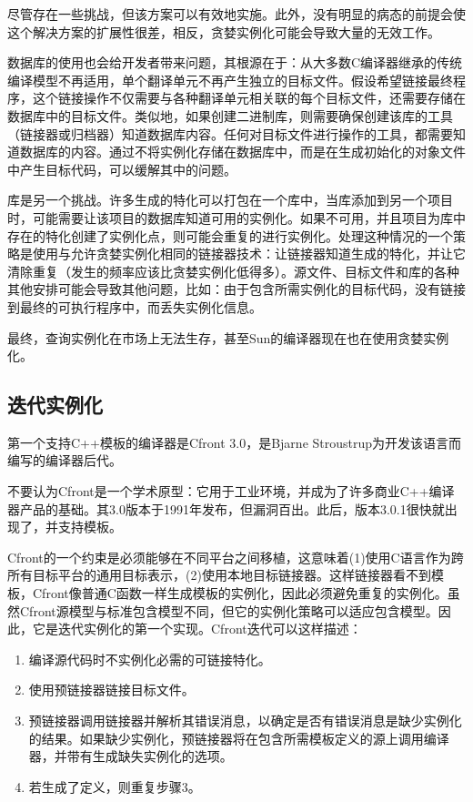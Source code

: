 尽管存在一些挑战，但该方案可以有效地实施。此外，没有明显的病态的前提会使这个解决方案的扩展性很差，相反，贪婪实例化可能会导致大量的无效工作。

数据库的使用也会给开发者带来问题，其根源在于：从大多数C编译器继承的传统编译模型不再适用，单个翻译单元不再产生独立的目标文件。假设希望链接最终程序，这个链接操作不仅需要与各种翻译单元相关联的每个目标文件，还需要存储在数据库中的目标文件。类似地，如果创建二进制库，则需要确保创建该库的工具（链接器或归档器）知道数据库内容。任何对目标文件进行操作的工具，都需要知道数据库的内容。通过不将实例化存储在数据库中，而是在生成初始化的对象文件中产生目标代码，可以缓解其中的问题。

库是另一个挑战。许多生成的特化可以打包在一个库中，当库添加到另一个项目时，可能需要让该项目的数据库知道可用的实例化。如果不可用，并且项目为库中存在的特化创建了实例化点，则可能会重复的进行实例化。处理这种情况的一个策略是使用与允许贪婪实例化相同的链接器技术：让链接器知道生成的特化，并让它清除重复（发生的频率应该比贪婪实例化低得多）。源文件、目标文件和库的各种其他安排可能会导致其他问题，比如：由于包含所需实例化的目标代码，没有链接到最终的可执行程序中，而丢失实例化信息。

最终，查询实例化在市场上无法生存，甚至Sun的编译器现在也在使用贪婪实例化。

\subsection{迭代实例化}

第一个支持C++模板的编译器是Cfront 3.0，是Bjarne Stroustrup为开发该语言而编写的编译器后代。

\begin{notice}
不要认为Cfront是一个学术原型：它用于工业环境，并成为了许多商业C++编译器产品的基础。其3.0版本于1991年发布，但漏洞百出。此后，版本3.0.1很快就出现了，并支持模板。
\end{notice}

Cfront的一个约束是必须能够在不同平台之间移植，这意味着(1)使用C语言作为跨所有目标平台的通用目标表示，(2)使用本地目标链接器。这样链接器看不到模板，Cfront像普通C函数一样生成模板的实例化，因此必须避免重复的实例化。虽然Cfront源模型与标准包含模型不同，但它的实例化策略可以适应包含模型。因此，它是迭代实例化的第一个实现。Cfront迭代可以这样描述：

\begin{enumerate}
\item 
编译源代码时不实例化必需的可链接特化。

\item 
使用预链接器链接目标文件。

\item 
预链接器调用链接器并解析其错误消息，以确定是否有错误消息是缺少实例化的结果。如果缺少实例化，预链接器将在包含所需模板定义的源上调用编译器，并带有生成缺失实例化的选项。

\item 
若生成了定义，则重复步骤3。
\end{enumerate}

